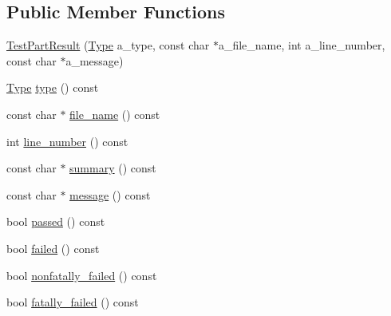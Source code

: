 \subsection*{Public Member Functions}
\begin{DoxyCompactItemize}
\item 
\hyperlink{classtesting_1_1_test_part_result_a6409eb519c1cd514aab2426c8f40737f}{Test\+Part\+Result} (\hyperlink{classtesting_1_1_test_part_result_a65ae656b33fdfdfffaf34858778a52d5}{Type} a\+\_\+type, const char $\ast$a\+\_\+file\+\_\+name, int a\+\_\+line\+\_\+number, const char $\ast$a\+\_\+message)
\item 
\hyperlink{classtesting_1_1_test_part_result_a65ae656b33fdfdfffaf34858778a52d5}{Type} \hyperlink{classtesting_1_1_test_part_result_ae852bf8693f066078c74c34345531940}{type} () const 
\item 
const char $\ast$ \hyperlink{classtesting_1_1_test_part_result_a5d8742dc28ddb880cd2391edb9fc2c9b}{file\+\_\+name} () const 
\item 
int \hyperlink{classtesting_1_1_test_part_result_a174900cf4403d23784af34f50e7b0a46}{line\+\_\+number} () const 
\item 
const char $\ast$ \hyperlink{classtesting_1_1_test_part_result_af0d4f960b453ce087c581fe13817b2a3}{summary} () const 
\item 
const char $\ast$ \hyperlink{classtesting_1_1_test_part_result_aae73962246be4d200e2c1d04246a708a}{message} () const 
\item 
bool \hyperlink{classtesting_1_1_test_part_result_a901bd62d9fbe7f39826a9d02ab2bdaec}{passed} () const 
\item 
bool \hyperlink{classtesting_1_1_test_part_result_aaf835515fb53eb1aa01c1798b05e61f6}{failed} () const 
\item 
bool \hyperlink{classtesting_1_1_test_part_result_a7bb08c87fbc1664f9fcca1504339ed29}{nonfatally\+\_\+failed} () const 
\item 
bool \hyperlink{classtesting_1_1_test_part_result_a34d31718b5fc6c06f73d03e8dbb1aa9e}{fatally\+\_\+failed} () const 
\end{DoxyCompactItemize}


